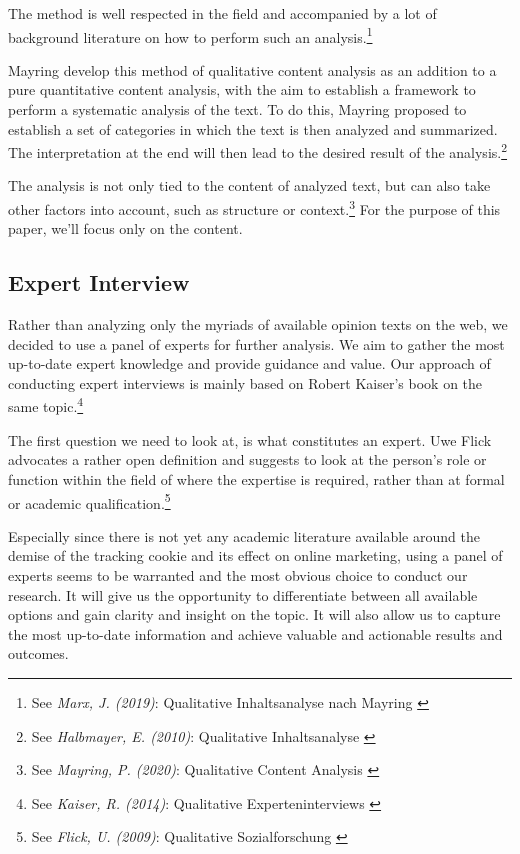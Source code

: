 The method is well respected in the field and accompanied by a lot of background literature on how to perform such an analysis.\footnote{See \textit{Marx, J. (2019)}: Qualitative Inhaltsanalyse nach Mayring \cite{qualiInhalt}}

Mayring develop this method of qualitative content analysis as an addition to a pure quantitative content analysis, with the aim to establish a framework to perform a systematic analysis of the text. To do this, Mayring proposed to establish a set of categories in which the text is then analyzed and summarized. The interpretation at the end will then lead to the desired result of the analysis.\footnote{See \textit{Halbmayer, E. (2010)}: Qualitative Inhaltsanalyse \cite{qualiVienna}}

The analysis is not only tied to the content of analyzed text, but can also take other factors into account, such as structure or context.\footnote{See \textit{Mayring, P. (2020)}: Qualitative Content Analysis \cite{qualiContent}} For the purpose of this paper, we'll focus only on the content.

\subsection{Expert Interview}

Rather than analyzing only the myriads of available opinion texts on the web, we decided to use a panel of experts for further analysis. We aim to gather the most up-to-date expert knowledge and provide guidance and value. Our approach of conducting expert interviews is mainly based on Robert Kaiser's book on the same topic.\footnote{See \textit{Kaiser, R. (2014)}: Qualitative Experteninterviews \cite{expertInterviews}}

The first question we need to look at, is what constitutes an expert. Uwe Flick advocates a rather open definition and suggests to look at the person's role or function within the field of where the expertise is required, rather than at formal or academic qualification.\footnote{See \textit{Flick, U. (2009)}: Qualitative Sozialforschung \cite{expertDefinition}}

Especially since there is not yet any academic literature available around the demise of the tracking cookie and its effect on online marketing, using a panel of experts seems to be warranted and the most obvious choice to conduct our research. It will give us the opportunity to differentiate between all available options and gain clarity and insight on the topic. It will also allow us to capture the most up-to-date information and achieve valuable and actionable results and outcomes.

